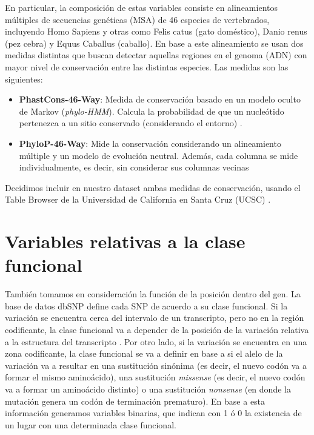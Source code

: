 En particular, la composición de estas variables consiste en alineamientos múltiples de secuencias genéticas (MSA) de 46 especies de vertebrados, incluyendo Homo Sapiens y otras como Felis catus (gato doméstico), Danio renus (pez cebra) y Equus Caballus (caballo). En base a este alineamiento se usan dos medidas distintas que buscan detectar aquellas regiones en el genoma (ADN) con mayor nivel de conservación entre las distintas especies. Las medidas son las siguientes:
\begin{itemize}
    \item \textbf{PhastCons-46-Way}: Medida de conservación basado en un modelo oculto de Markov (\textit{phylo-HMM}). Calcula la probabilidad de que un nucleótido pertenezca a un sitio conservado (considerando el entorno) \cite{siepel2005evolutionarily}.
    \item \textbf{PhyloP-46-Way}: Mide la conservación considerando un alineamiento múltiple y un modelo de evolución neutral. Además, cada columna se mide individualmente, es decir, sin considerar sus columnas vecinas \cite{Pollard2010} 
\end{itemize}

Decidimos incluir en nuestro dataset ambas medidas de conservación, usando el Table Browser de la Universidad de California en Santa Cruz (UCSC) \cite{Karolchik2004}.

\section{Variables relativas a la clase funcional}

También tomamos en consideración la función de la posición dentro del gen. La base de datos dbSNP define cada SNP de acuerdo a su clase funcional. Si la variación se encuentra cerca del intervalo de un transcripto, pero no en la región codificante, la clase funcional va a depender de la posición de la variación relativa a la estructura del transcripto \cite{Kitts2014}.  Por otro lado, si la variación se encuentra en una zona codificante, la clase funcional se va a definir en base a si el alelo de la variación va a resultar en una sustitución sinónima (es decir, el nuevo codón va a formar el mismo aminoácido), una sustitución \textit{missense} (es decir, el nuevo codón va a formar un aminoácido distinto) o una sustitución \textit{nonsense} (en donde la mutación genera un codón de terminación prematuro). En base a esta información generamos variables binarias, que indican con 1 ó 0 la existencia de un lugar con una determinada clase funcional.

